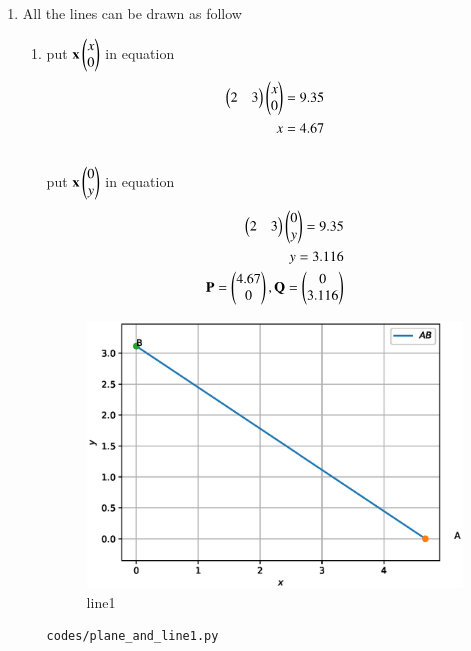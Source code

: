 \renewcommand{\theequation}{\theenumi}
\begin{enumerate}[label=\arabic*.,ref=\thesubsection.\theenumi]
\item All the lines can be drawn as follow
\begin{enumerate}
\item put $\mathbf x \begin{pmatrix}x\\0\end{pmatrix}$ in equation
\\ 
\begin{align}
\begin{pmatrix}2 & 3\end{pmatrix}\begin{pmatrix}x\\0\end{pmatrix} = 9.35
\\
x= 4.67
\end{align}
\\
put $\mathbf x \begin{pmatrix}0\\y\end{pmatrix}$ in equation
\\
\begin{align}
\begin{pmatrix}2 & 3\end{pmatrix}\begin{pmatrix}0\\y\end{pmatrix} = 9.35
\\
y= 3.116
\\
\mathbf{P} = \begin{pmatrix}4.67\\0\end{pmatrix}, \mathbf{Q} = \begin{pmatrix}0\\3.116\end{pmatrix}
\end{align}
\begin{figure}[!ht]
	\centering
	\includegraphics[width=\columnwidth]{./figures/plane_and_line1.eps}
	\caption{line1 }
	\label{fig:line1}
\end{figure}
\begin{lstlisting}
codes/plane_and_line1.py
\end{lstlisting}




\end{enumerate}
\end{enumerate}

